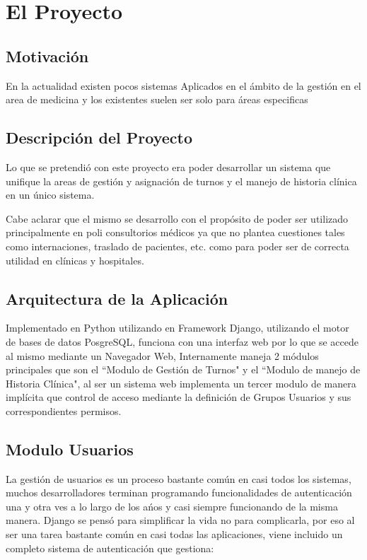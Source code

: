 \chapter{El Proyecto}


\section{Motivación}

En la actualidad existen pocos sistemas Aplicados en el ámbito de la gestión en el area de medicina y los existentes suelen ser solo para áreas especificas


\section{Descripción del Proyecto}

Lo que se pretendió con este proyecto era poder desarrollar un sistema que unifique la areas de gestión y asignación de turnos y el manejo de historia clínica en un único sistema.

Cabe aclarar que el mismo se desarrollo con el propósito de poder ser utilizado principalmente en poli consultorios médicos ya que no plantea cuestiones tales como internaciones, traslado de pacientes, etc. como para poder ser de correcta utilidad en clínicas y hospitales. 


\section{Arquitectura de la Aplicación}

Implementado en Python utilizando en Framework Django, utilizando el motor de bases de datos PosgreSQL, funciona con una interfaz web por lo que se accede al mismo mediante un Navegador Web, Internamente maneja 2 módulos principales que son el  ``Modulo de Gestión de Turnos" y el ``Modulo de manejo de
Historia Clínica", al ser un sistema web implementa un tercer modulo de manera implícita que control de acceso mediante la definición de Grupos Usuarios y sus correspondientes permisos.


\section{Modulo Usuarios}

La gestión de usuarios es un proceso bastante común en casi todos los sistemas, muchos desarrolladores terminan programando funcionalidades de autenticación una y otra ves a lo largo de los a\'nos y casi siempre funcionando de la misma manera. Django se pensó para simplificar la vida no para complicarla, por eso
al ser una tarea bastante común en casi todas las aplicaciones, viene incluido un completo sistema de autenticación que gestiona:

